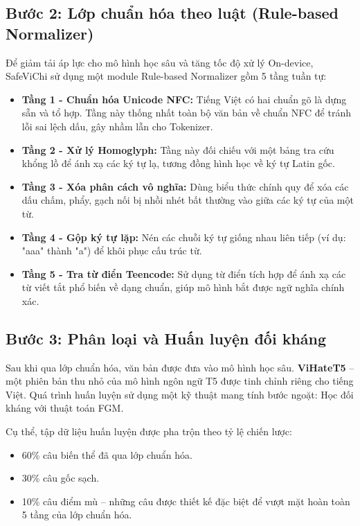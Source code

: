 \documentclass[12pt,a4paper]{article}
\begin{document}
\subsection{Bước 2: Lớp chuẩn hóa theo luật (Rule-based Normalizer)}
Để giảm tải áp lực cho mô hình học sâu và tăng tốc độ xử lý On-device, SafeViChi sử dụng một module Rule-based Normalizer gồm 5 tầng tuần tự:
\begin{itemize}
    \item \textbf{Tầng 1 - Chuẩn hóa Unicode NFC:} Tiếng Việt có hai chuẩn gõ là dựng sẵn và tổ hợp. Tầng này thống nhất toàn bộ văn bản về chuẩn NFC để tránh lỗi sai lệch dấu, gây nhầm lẫn cho Tokenizer.
    \item \textbf{Tầng 2 - Xử lý Homoglyph:} Tầng này đối chiếu với một bảng tra cứu khổng lồ để ánh xạ các ký tự lạ, tương đồng hình học về ký tự Latin gốc.
    \item \textbf{Tầng 3 - Xóa phân cách vô nghĩa:} Dùng biểu thức chính quy để xóa các dấu chấm, phẩy, gạch nối bị nhồi nhét bất thường vào giữa các ký tự của một từ.
    \item \textbf{Tầng 4 - Gộp ký tự lặp:} Nén các chuỗi ký tự giống nhau liên tiếp (ví dụ: "aaa" thành "a") để khôi phục cấu trúc từ.
    \item \textbf{Tầng 5 - Tra từ điển Teencode:} Sử dụng từ điển tích hợp để ánh xạ các từ viết tắt phổ biến về dạng chuẩn, giúp mô hình bắt được ngữ nghĩa chính xác.
\end{itemize}

\subsection{Bước 3: Phân loại và Huấn luyện đối kháng}
Sau khi qua lớp chuẩn hóa, văn bản được đưa vào mô hình học sâu. \textbf{ViHateT5} – một phiên bản thu nhỏ của mô hình ngôn ngữ T5 được tinh chỉnh riêng cho tiếng Việt. Quá trình huấn luyện sử dụng một kỹ thuật mang tính bước ngoặt: Học đối kháng với thuật toán FGM.

Cụ thể, tập dữ liệu huấn luyện được pha trộn theo tỷ lệ chiến lược:
\begin{itemize}
    \item 60\% câu biến thể đã qua lớp chuẩn hóa.
    \item 30\% câu gốc sạch.
    \item 10\% câu điểm mù – những câu được thiết kế đặc biệt để vượt mặt hoàn toàn 5 tầng của lớp chuẩn hóa.
\end{itemize}
\end{document}
